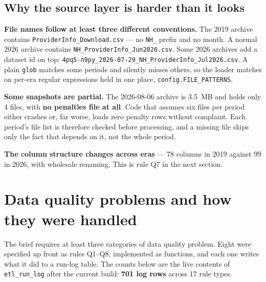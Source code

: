\documentclass[11pt,a4paper]{article}
\newcommand{\code}[1]{\texttt{#1}}
\begin{document}
\subsection{Why the source layer is harder than it looks}

\begin{warnbox}[title={Three traps found by opening the real files, not by reading documentation}]
\textbf{File names follow at least three different conventions.} The 2019
archive contains \code{ProviderInfo\_Download.csv} — no \code{NH\_} prefix and
no month. A normal 2026 archive contains \code{NH\_ProviderInfo\_Jun2026.csv}.
Some 2026 archives add a dataset id on top:
\code{4pq5-n9py\_2026-07-29\_NH\_ProviderInfo\_Jul2026.csv}. A plain \code{glob}
matches some periods and silently misses others, so the loader matches on
per-era regular expressions held in one place, \code{config.FILE\_PATTERNS}.

\vspace{0.3em}
\textbf{Some snapshots are partial.} The 2026-08-06 archive is 3.5~MB and holds
only 4 files, with \textbf{no penalties file at all}. Code that assumes six
files per period either crashes or, far worse, loads zero penalty rows without
complaint. Each period's file list is therefore checked before processing, and
a missing file skips only the fact that depends on it, not the whole period.

\vspace{0.3em}
\textbf{The column structure changes across eras} — 78 columns in 2019 against
99 in 2026, with wholesale renaming. This is rule Q7 in the next section.
\end{warnbox}

\section{Data quality problems and how they were handled}

The brief requires at least three categories of data quality problem. Eight
were specified up front as rules Q1--Q8, implemented as functions, and each one
writes what it did to a run-log table. The counts below are the live contents
of \code{etl\_run\_log} after the current build: \textbf{701 log rows} across
17 rule types.
\end{document}

